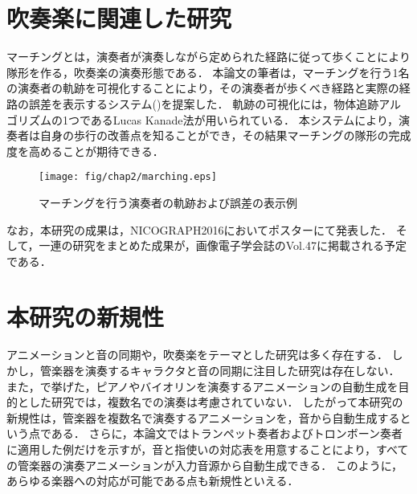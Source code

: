 \section{吹奏楽に関連した研究} \label{sec:marching}
マーチングとは，演奏者が演奏しながら定められた経路に従って歩くことにより隊形を作る，吹奏楽の演奏形態である．
本論文の筆者は，マーチングを行う1名の演奏者の軌跡を可視化することにより，その演奏者が歩くべき経路と実際の経路の誤差を表示するシステム()を提案した．
軌跡の可視化には，物体追跡アルゴリズムの1つであるLucas Kanade法\cite{Lucas}が用いられている．
本システムにより，演奏者は自身の歩行の改善点を知ることができ，その結果マーチングの隊形の完成度を高めることが期待できる．
\begin{figure}[H]
	\centering
	\texttt{[image: fig/chap2/marching.eps]}
	\caption{マーチングを行う演奏者の軌跡および誤差の表示例}
	\label{fig:marching}
\end{figure}
なお，本研究の成果は，NICOGRAPH2016においてポスター\cite{nicograph}にて発表した．
そして，一連の研究をまとめた成果が，画像電子学会誌のVol.47\cite{iieej}に掲載される予定である．

\section{本研究の新規性}\label{sec:compere}
アニメーションと音の同期や，吹奏楽をテーマとした研究は多く存在する．
しかし，管楽器を演奏するキャラクタと音の同期に注目した研究は存在しない．
また，で挙げた，ピアノやバイオリンを演奏するアニメーションの自動生成を目的とした研究では，複数名での演奏は考慮されていない．
したがって本研究の新規性は，管楽器を複数名で演奏するアニメーションを，音から自動生成するという点である．
さらに，本論文ではトランペット奏者およびトロンボーン奏者に適用した例だけを示すが，音と指使いの対応表を用意することにより，すべての管楽器の演奏アニメーションが入力音源から自動生成できる．
このように，あらゆる楽器への対応が可能である点も新規性といえる．